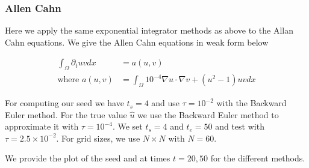 \documentclass{article}
\begin{document}
\subsubsection{Allen Cahn}
Here we apply the same exponential integrator methods as above to the Allan Cahn equations.
We give the Allen Cahn equations in weak form below

\begin{align*}
\int_{\Omega} \partial_tu v dx &= a(u,v)\\
\text {where } a(u,v) &= \int_{\Omega} 10^{-4} \nabla u \cdot \nabla v + (u^2-1)uv dx
\end{align*}

For computing our seed we have $t_s = 4$ and use $\tau = 10^{-2}$ with the Backward Euler method.
For the true value $\hat u$ we use the Backward Euler method to approximate it with $\tau = 10^{-4}$.
We set $t_s = 4$ and $t_e = 50$ and test with $\tau = 2.5\times 10^{-2}$.
For grid sizes, we use $N\times N$ with $N = 60$.


We provide the plot of the seed and at times $t = 20, 50$ for the different methods. 
\end{document}
